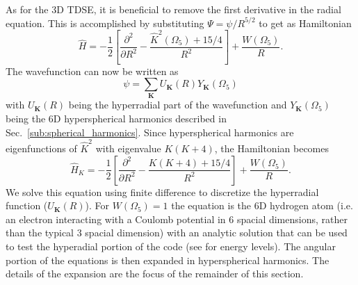 As for the 3D TDSE, it is beneficial to remove the first derivative in the radial equation. This is accomplished by substituting $\Psi = \psi/R^{5/2}$ to get as Hamiltonian
\begin{equation}
   \hat{H} = -\frac{1}{2} \left[\frac{\partial^2}{\partial R^2} - \frac{\hat{K}^2(\Omega_5)+15/4}{R^2}\right] + \frac{W(\Omega_5)}{R}.
\end{equation}
The wavefunction can now be written as
\begin{equation}
    \psi = \sum\limits_{\mathbf{K}} U_{\mathbf{K}}(R) Y_{\mathbf{K}}(\Omega_5)
\end{equation}
with $U_{\mathbf{K}}(R)$ being the hyperradial part of the wavefunction and $Y_{\mathbf{K}}(\Omega_5)$ being the 6D hyperspherical harmonics described in Sec.~\ref{sub:spherical_harmonics}. Since hyperspherical harmonics are eigenfunctions of $\hat{K}^2$ with eigenvalue $K(K+4)$, the Hamiltonian becomes
\begin{equation}
   \hat{H}_{K} = -\frac{1}{2} \left[\frac{\partial^2}{\partial R^2} - \frac{K(K+4)+15/4}{R^2}\right] + \frac{W(\Omega_5)}{R}.
\end{equation}
We solve this equation using finite difference to discretize the hyperradial function ($U_{\mathbf{K}}(R)$). For $W(\Omega_5)=1$ the equation is the 6D hydrogen atom (i.e. an electron interacting with a Coulomb potential in 6 spacial dimensions, rather than the typical 3 spacial dimension) with an analytic solution that can be used to test the hyperadial portion of the code (see \cite{sorevik2005} for energy levels). The angular portion of the equations is then expanded in hyperspherical harmonics. The details of the expansion are the focus of the remainder of this section.

